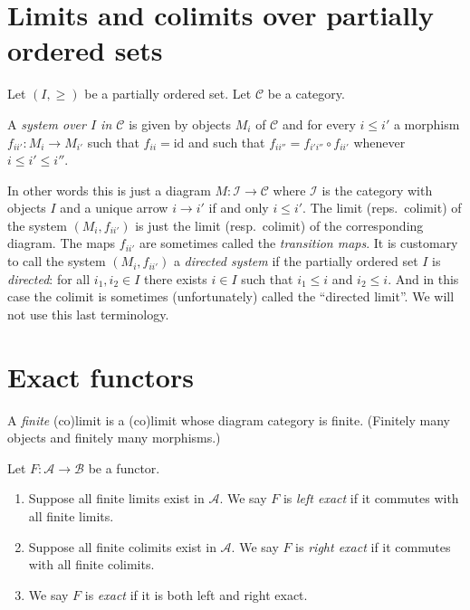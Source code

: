 \section{Limits and colimits over partially ordered sets}
\label{section-posets-limits}

\noindent
Let $(I, \geq)$ be a partially ordered set.
Let $\mathcal{C}$ be a category.

\begin{definition}
\label{definition-system-over-poset}
A {\it system over $I$ in $\mathcal{C}$} is given by 
objects $M_i$ of $\mathcal{C}$ and for every $i \leq i'$ a
morphism $f_{ii'} : M_i \to M_{i'}$ such that $f_{ii}
= \text{id}$ and such that $f_{ii''} = f_{i'i''} \circ f_{i i'}$
whenever $i \leq i' \leq i''$.
\end{definition}

\noindent
In other words this is just a diagram $M : \mathcal{I}
\to \mathcal{C}$ where $\mathcal{I}$ is the category with
objects $I$ and a unique arrow $i \to i'$ if and only
$i \leq i'$. The limit (reps.\ colimit) of the system
$(M_i, f_{ii'})$ is just the limit (resp.\ colimit)
of the corresponding diagram. The maps $f_{ii'}$ are sometimes
called the {\it transition maps}.
It is customary to call the system
$(M_i, f_{ii'})$ a {\it directed system} if the partially
ordered set $I$ is {\it directed}: for all $i_1,i_2 \in I$
there exists $i\in I$ such that $i_1 \leq i$ and $i_2 \leq i$.
And in this case the colimit is sometimes (unfortunately)
called the ``directed limit''. We will not use this last
terminology.

\section{Exact functors}
\label{section-exact-functor}

\noindent
A {\it finite} (co)limit is a (co)limit whose diagram category is finite.
(Finitely many objects and finitely many morphisms.)

\begin{definition}
\label{definition-exact}
Let $F : \mathcal{A} \to \mathcal{B}$ be a functor.
\begin{enumerate}
\item Suppose all finite limits exist in $\mathcal{A}$.
We say $F$ is {\it left exact} if it commutes
with all finite limits.
\item Suppose all finite colimits exist in $\mathcal{A}$.
We say $F$ is {\it right exact} if it commutes
with all finite colimits.
\item We say $F$ is {\it exact} if it is both left and right
exact.
\end{enumerate}
\end{definition}

